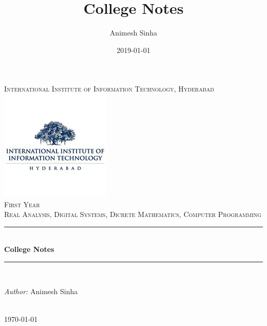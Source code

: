 \documentclass{book}
\title{College Notes}
\date{2019-01-01}
\author{Animesh Sinha}
\begin{document}


\begin{titlepage}
    \newcommand{\HRule}{\rule{\linewidth}{0.5mm}}
    \center
    \textsc{\LARGE International Institute of Information Technology, Hyderabad}\\[1.5cm]
    \includegraphics[scale=1]{img/iiit-logo.jpeg}\\[0.5cm]
    \textsc{\Large First Year}\\[0.5cm]
    \textsc{\large Real Analysis, Digital Systems, Dicrete Mathematics, Computer Programming}\\[0.5cm] %
    \HRule \\[0.4cm]
    { \huge \bfseries College Notes}\\[0.4cm]
    \HRule \\[1.5cm]
    \begin{minipage}{0.4\textwidth}
    \begin{flushleft} \large
    \emph{Author:} Animesh Sinha
    \end{flushleft}
    \end{minipage}\\[2cm]
    {\large \today}\\[2cm]
    \vfill
\end{titlepage}




\end{document}
